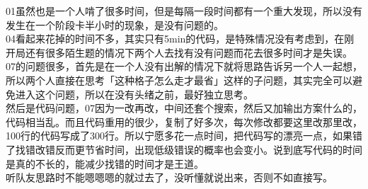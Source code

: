 \documentclass[a4paper, 11pt, nofonts, nocap, fancyhdr]{ctexart}
\begin{document}
01虽然也是一个人啃了很多时间，但是每隔一段时间都有一个重大发现，所以没有发生在一个阶段卡半小时的现象，是没有问题的。\\04看起来花掉的时间不多，其实只有5min的代码，是特殊情况没有考虑到，在刚开局还有很多陌生题的情况下两个人去找有没有问题而花去很多时间才是失误。\\
07的问题很多，首先是在一个人没有出解的情况下就将思路告诉另一个人一起想，所以两个人直接在思考「这种格子怎么走才最省」这样的子问题，其实完全可以避免进入这个问题，所以在没有头绪之前，最好独立思考。\\
然后是代码问题，07因为一改再改，中间还套个搜索，然后又加输出方案什么的，代码相当乱。而且代码重用的很少，复制了好多次，每次修改都要这里改那里改，100行的代码写成了300行。所以宁愿多花一点时间，把代码写的漂亮一点，如果错了找错改错反而更节省时间，出现低级错误的概率也会变小。说到底写代码的时间是真的不长的，能减少找错的时间才是王道。\\
听队友思路时不能嗯嗯嗯的就过去了，没听懂就说出来，否则不如直接写。
\end{document}
